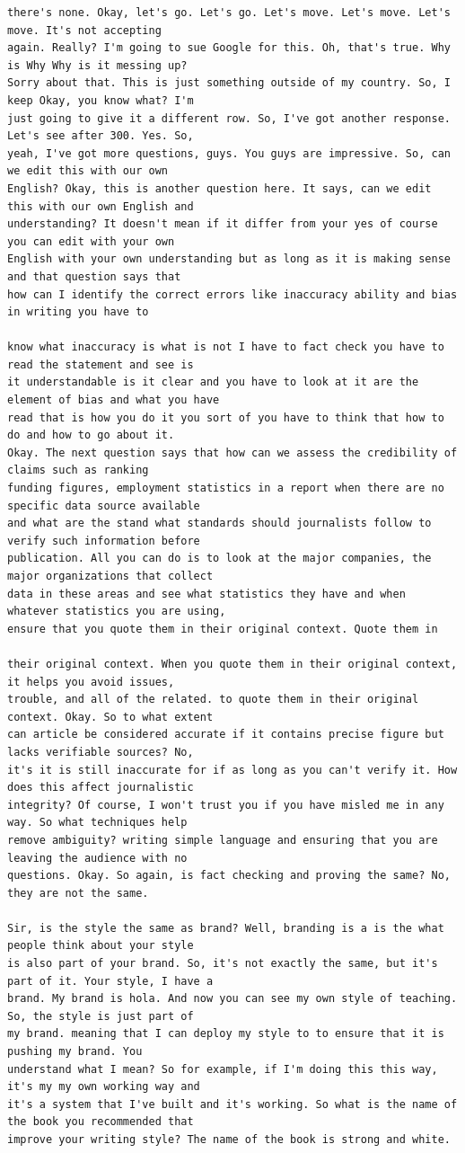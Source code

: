 {\begin{Verbatim}
there's none. Okay, let's go. Let's go. Let's move. Let's move. Let's move. It's not accepting
again. Really? I'm going to sue Google for this. Oh, that's true. Why is Why Why is it messing up?
Sorry about that. This is just something outside of my country. So, I keep Okay, you know what? I'm
just going to give it a different row. So, I've got another response. Let's see after 300. Yes. So,
yeah, I've got more questions, guys. You guys are impressive. So, can we edit this with our own
English? Okay, this is another question here. It says, can we edit this with our own English and
understanding? It doesn't mean if it differ from your yes of course you can edit with your own
English with your own understanding but as long as it is making sense and that question says that
how can I identify the correct errors like inaccuracy ability and bias in writing you have to

know what inaccuracy is what is not I have to fact check you have to read the statement and see is
it understandable is it clear and you have to look at it are the element of bias and what you have
read that is how you do it you sort of you have to think that how to do and how to go about it.
Okay. The next question says that how can we assess the credibility of claims such as ranking
funding figures, employment statistics in a report when there are no specific data source available
and what are the stand what standards should journalists follow to verify such information before
publication. All you can do is to look at the major companies, the major organizations that collect
data in these areas and see what statistics they have and when whatever statistics you are using,
ensure that you quote them in their original context. Quote them in

their original context. When you quote them in their original context, it helps you avoid issues,
trouble, and all of the related. to quote them in their original context. Okay. So to what extent
can article be considered accurate if it contains precise figure but lacks verifiable sources? No,
it's it is still inaccurate for if as long as you can't verify it. How does this affect journalistic
integrity? Of course, I won't trust you if you have misled me in any way. So what techniques help
remove ambiguity? writing simple language and ensuring that you are leaving the audience with no
questions. Okay. So again, is fact checking and proving the same? No, they are not the same.

Sir, is the style the same as brand? Well, branding is a is the what people think about your style
is also part of your brand. So, it's not exactly the same, but it's part of it. Your style, I have a
brand. My brand is hola. And now you can see my own style of teaching. So, the style is just part of
my brand. meaning that I can deploy my style to to ensure that it is pushing my brand. You
understand what I mean? So for example, if I'm doing this this way, it's my my own working way and
it's a system that I've built and it's working. So what is the name of the book you recommended that
improve your writing style? The name of the book is strong and white.


\end{Verbatim}}
